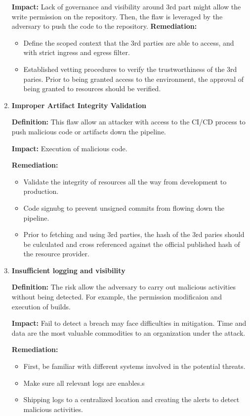 \begin{enumerate}[label=(\arabic*)]
    \textbf{Impact: }
        Lack of governance and visibility around 3rd part might allow the write permission on the repository.
        Then, the flaw is leveraged by the adversary to push the code to the repository.
    \textbf{Remediation:}
        \begin{itemize}
            \item Define the scoped context that the 3rd parties are able to access, and with strict ingress
            and egress filter.
            \item Established vetting procedures to verify the trustworthiness of the 3rd paries. Prior to being 
            granted access to the environment, the approval of being granted to resources should be verified.
        \end{itemize}
    \item \textbf{Improper Artifact Integrity Validation}

    \textbf{Definition: }
        This flaw allow an attacker with access to the CI/CD process to push malicious code or artifacts down 
        the pipeline.

    \textbf{Impact: }
        Execution of malicious code.

    \textbf{Remediation:}
        \begin{itemize}
            \item Validate the integrity of resources all the way from development to production.
            \item Code signubg to prevent unsigned commits from flowing down the pipeline.
            \item Prior to fetching and using 3rd parties, the hash of the 3rd paries should be culculated and 
            cross referenced against the official published hash of the resource provider.
        \end{itemize}
        
    \item \textbf{Insufficient logging and visibility}

    \textbf{Definition: }
        The risk allow the adversary to carry out malicious activities without being detected.
        For example, the permission modificaion and execution of builds.

    \textbf{Impact: }
        Fail to detect a breach may face difficulties in mitigation. Time and data are the most 
        valuable commodities to an organization under the attack.

    \textbf{Remediation:}
        \begin{itemize}
            \item First, be familiar with different systems involved in the potential threats.
            \item Make sure all relevant logs are enables.s
            \item Shipping logs to a centralized location and creating the alerts to detect malicious activities.
        \end{itemize}
\end{enumerate}



